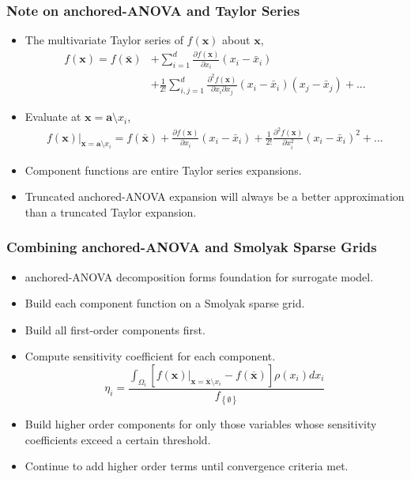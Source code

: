 \documentclass{beamer}
\begin{document}
\begin{frame}
\frametitle{Note on anchored-ANOVA and Taylor Series}

\begin{itemize}
  \item The multivariate Taylor series of $f(\textbf{x})$ about $\textbf{\=x}$,
\begin{align*} 
 f\left(\textbf{x}\right) = 
  f\left(\bar{\textbf{x}}\right) &+
   \sum_{i=1}^{d} 
    \frac{\partial f(\textbf{x})}{\partial x_i}\left(x_i - \bar{x}_i\right) \\
     &+ \frac{1}{2!}\sum_{i,j=1}^{d}
      \frac{\partial^2 f(\textbf{x})}{\partial x_i\partial x_j}
       \left(x_i - \bar{x}_i\right) \left(x_j - \bar{x}_j\right) + ...
\end{align*}  
  \item Evaluate at $\textbf{x} = \textbf{a}\setminus x_i$,
\begin{align*} 
    f\left(\textbf{x}\right)\vert_{\textbf{x} = \textbf{a}\setminus x_i} = 
     f\left(\bar{\textbf{x}}\right) +
      \frac{\partial f(\textbf{x})}{\partial x_i}\left(x_i - \bar{x}_i\right)
       + \frac{1}{2!} \frac{\partial^2 f(\textbf{x})}{\partial x_i^2}
        \left(x_i - \bar{x}_i\right)^2 + ...
\end{align*}
  \item Component functions are entire Taylor series expansions.
  \item Truncated anchored-ANOVA expansion will always be a better approximation than a truncated Taylor expansion. 
      
\end{itemize}

\end{frame}
\begin{frame}
\frametitle{Combining anchored-ANOVA and Smolyak Sparse Grids}

\begin{itemize}
  \item anchored-ANOVA decomposition forms foundation for surrogate model.
  \item Build each component function on a Smolyak sparse grid.
  \item Build all first-order components first. 
  \item Compute sensitivity coefficient for each component. 
\begin{equation} 
 \eta_i = \frac{
  \int_{\Omega_i}
   \left[f(\textbf{x})\vert_{
    \textbf{x}=\overline{\textbf{x}}\setminus x_i}
     -f(\overline{\textbf{x}}) \right]\rho(x_i)dx_i}
      {
       f_{\left\{\emptyset\right\}}} \nonumber
\end{equation}
  \item Build higher order components for only those variables whose sensitivity coefficients  exceed a certain threshold.
  \item Continue to add higher order terms until convergence criteria met.     
\end{itemize}

\end{frame}
\end{document}
